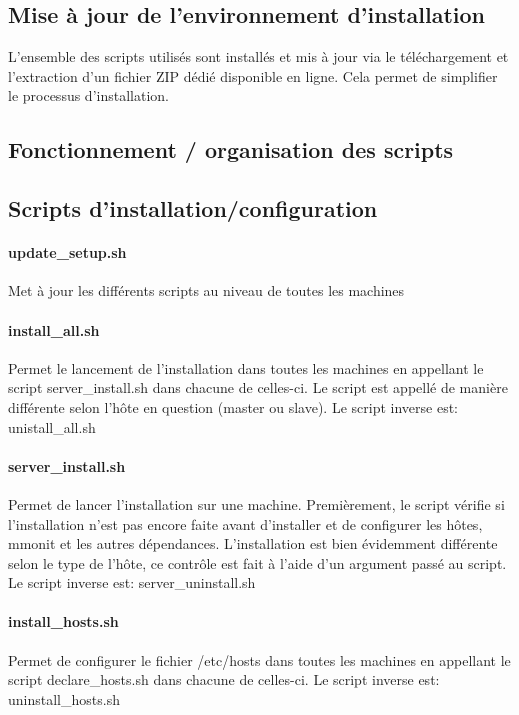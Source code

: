 \documentclass[a4paper, 11pt, titlepage]{article}
\begin{document}
\subsection {Mise à jour de l'environnement d'installation}

L'ensemble des scripts utilisés sont installés et mis à jour via le téléchargement et l'extraction d'un fichier ZIP dédié disponible en ligne. Cela permet de simplifier le processus d'installation.


\subsection {Fonctionnement / organisation des scripts}

\subsection{Scripts d'installation/configuration}

\paragraph{update\_setup.sh}

Met à jour les différents scripts au niveau de toutes les machines

\paragraph{install\_all.sh}
Permet le lancement de l'installation dans toutes les machines en appellant le script server\_install.sh dans chacune de celles-ci. Le script est appellé de manière différente selon l'hôte en question (master ou slave). Le script inverse est: unistall\_all.sh


\paragraph{server\_install.sh}
Permet de lancer l'installation sur une machine.
Premièrement, le script vérifie si l'installation n'est pas encore faite avant d'installer et de configurer les hôtes, mmonit et les autres dépendances. L'installation est bien évidemment différente selon le type de l'hôte, ce contrôle est fait à l'aide d'un argument passé au script. Le script inverse est: server\_uninstall.sh

\paragraph{install\_hosts.sh}
Permet de configurer le fichier /etc/hosts dans toutes les machines en appellant le script declare\_hosts.sh dans chacune de celles-ci. Le script inverse est: uninstall\_hosts.sh
\end{document}
